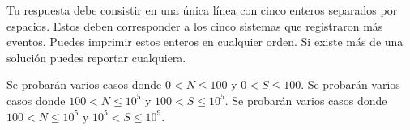 \documentclass{oci}
\begin{document}
\begin{outputDescription}
  Tu respuesta debe consistir en una única línea con cinco enteros separados por espacios.
  Estos deben corresponder a los cinco sistemas que registraron más eventos.
  Puedes imprimir estos enteros en cualquier orden.
  Si existe más de una solución puedes reportar cualquiera.
\end{outputDescription}

\begin{scoreDescription}
   Se probarán varios casos donde $0 < N \le 100$ y $0 < S \le 100$.
   Se probarán varios casos donde $100 < N \le 10^5$ y $100 < S \le 10^5$.
   Se probarán varios casos donde $100 < N \le 10^5$ y $10^5 < S \le 10^9$.
\end{scoreDescription}

\begin{sampleDescription}
\end{sampleDescription}
\end{document}
